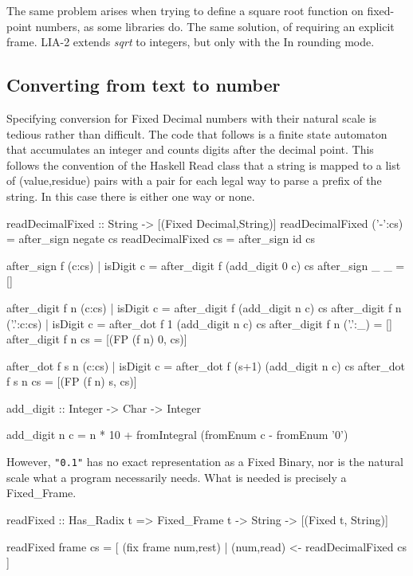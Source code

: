 \documentclass{article}
\begin{document}
The same problem arises when trying to define a square root
function on fixed-point numbers, as some libraries do.  The
same solution, of requiring an explicit frame.  LIA-2 extends
{\it sqrt} to integers, but only with the In rounding mode.

\subsection{Converting from text to number}

Specifying conversion for Fixed Decimal numbers
with their natural scale is tedious rather than difficult.
The code that follows is a finite state automaton that
accumulates an integer and counts digits after the decimal point.
This follows the convention of the Haskell Read class that
a string is mapped to a list of (value,residue) pairs with a
pair for each legal way to parse a prefix of the string.  In
this case there is either one way or none.

\begin{code}
readDecimalFixed :: String -> [(Fixed Decimal,String)]
readDecimalFixed ('-':cs) = after_sign negate cs
readDecimalFixed cs       = after_sign id     cs

after_sign f (c:cs)
  | isDigit c = after_digit f (add_digit 0 c) cs
after_sign _ _ = []

after_digit f n (c:cs)
  | isDigit c = after_digit f (add_digit n c) cs
after_digit f n ('.':c:cs)
  | isDigit c = after_dot f 1 (add_digit n c) cs
after_digit f n ('.':_) = []
after_digit f n cs = [(FP (f n) 0, cs)]

after_dot f s n (c:cs)
  | isDigit c = after_dot f (s+1) (add_digit n c) cs
after_dot f s n cs = [(FP (f n) s, cs)]

add_digit :: Integer -> Char -> Integer

add_digit n c =
   n * 10 + fromIntegral (fromEnum c - fromEnum '0')
\end{code}

However, \verb|"0.1"| has no exact representation as a
Fixed Binary, nor is the natural scale what a
program necessarily needs.  What is needed is precisely
a Fixed\_Frame.

\begin{code}
readFixed :: Has_Radix t =>
             Fixed\_Frame t -> String ->
             [(Fixed t, String)]

readFixed frame cs =
   [ (fix frame num,rest) | (num,read) <- readDecimalFixed cs ]
\end{code}
\end{document}

